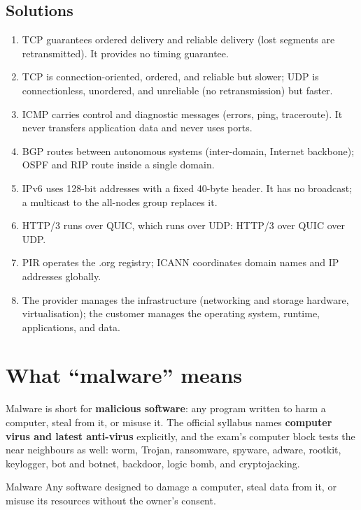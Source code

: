 \subsection*{Solutions}
\begingroup\small
\begin{enumerate}[label=\arabic*.]
  \item TCP guarantees ordered delivery and reliable delivery (lost segments
    are retransmitted). It provides no timing guarantee.
  \item TCP is connection-oriented, ordered, and reliable but slower; UDP is
    connectionless, unordered, and unreliable (no retransmission) but faster.
  \item ICMP carries control and diagnostic messages (errors, ping,
    traceroute). It never transfers application data and never uses ports.
  \item BGP routes between autonomous systems (inter-domain, Internet
    backbone); OSPF and RIP route inside a single domain.
  \item IPv6 uses 128-bit addresses with a fixed 40-byte header. It has no
    broadcast; a multicast to the all-nodes group replaces it.
  \item HTTP/3 runs over QUIC, which runs over UDP: HTTP/3 over QUIC over
    UDP.
  \item PIR operates the .org registry; ICANN coordinates domain names and
    IP addresses globally.
  \item The provider manages the infrastructure (networking and storage
    hardware, virtualisation); the customer manages the operating system,
    runtime, applications, and data.
\end{enumerate}
\endgroup

\section{What ``malware'' means}
Malware is short for \textbf{malicious software}: any program written to
harm a computer, steal from it, or misuse it. The official syllabus names
\textbf{computer virus and latest anti-virus} explicitly, and the exam's
computer block tests the near neighbours as well: worm, Trojan, ransomware,
spyware, adware, rootkit, keylogger, bot and botnet, backdoor, logic bomb,
and cryptojacking.

\begin{definitionbox}{Malware}
Any software designed to damage a computer, steal data from it, or misuse
its resources without the owner's consent.
\end{definitionbox}

